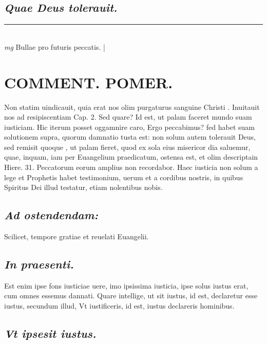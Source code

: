 \documentclass{article}
\begin{document}
\begin{pages}
\subsection*{\textit{Quae Deus tolerauit. }}
\vspace{0.5cm}\noindent
\vspace{0.2cm}\rule{1cm}{0.2pt}\\ 
\hspace{0.2cm}\textit{mg}
\footnotesize Bullae pro futuris peccatis. 
\normalsize| 
\section*{COMMENT. POMER.  }\pstart Non statim uindicauit, quia erat nos olim purgaturus sanguine Christi . Inuitauit nos ad resipiscentiam Cap. 2. Sed quare?  \pend\pstart Id est, ut palam faceret mundo suam iusticiam.  Hic iterum posset oggamnire caro, Ergo peccabimus? fed habet suam solutionem supra, quorum damnatio tusta est: non solum autem tolerauit Deus, sed remisit quoque , ut palam fieret, quod ex sola eius misericor dia saluemur, quae, inquam, iam per Euangelium praedicatum, ostensa est, et olim descriptain Hiere. 31.  Peccatorum eorum amplius non recordabor. Haec iusticia non solum a lege et Prophetis habet testimonium, uerum et a cordibus nostris, in quibus Spiritus Dei illud testatur, etiam nolentibus nobis.   \pend
{}
{}
\subsection*{\textit{Ad ostendendam: }}\pstart Scilicet, tempore gratiae et reuelati Euangelii.  \pend
{}
{}
\subsection*{\textit{In praesenti. }}\pstart Est enim ipse fons iusticiae uere, imo ipsissima iusticia, ipse solus iustus erat, cum omnes essemus dannati. Quare intellige, ut sit iustus, id est, declaretur esse iustus, secundum illud, Vt iustificeris, id est, iustus declareris hominibus.   \pend
{}
{}
\subsection*{\textit{Vt ipsesit iustus. }}
{}

\end{pages}
\end{document}

